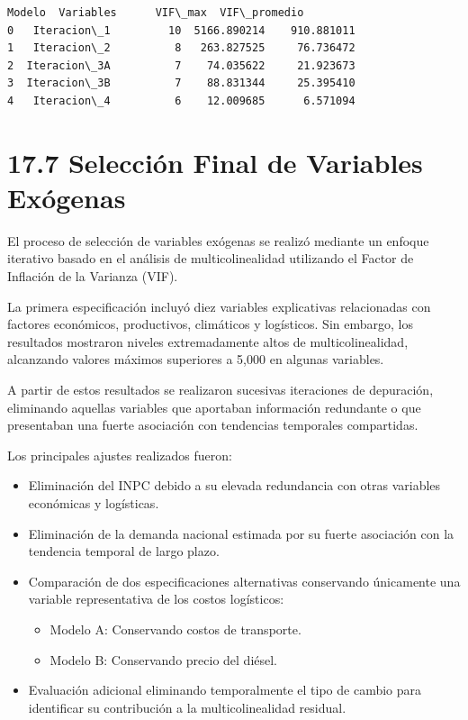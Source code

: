 \documentclass[11pt]{article}
\makeatletter
\providecommand{\tightlist}{%
      \setlength{\itemsep}{0pt}\setlength{\parskip}{0pt}}
\newcommand{\boxspacing}{\kern\kvtcb@left@rule\kern\kvtcb@boxsep}
\newcommand{\prompt}[4]{
        {\ttfamily\llap{{\color{#2}[#3]:\hspace{3pt}#4}}\vspace{-\baselineskip}}
    }
\makeatother
\begin{document}
            \begin{tcolorbox}[breakable, size=fbox, boxrule=.5pt, pad at break*=1mm, opacityfill=0]
\prompt{Out}{outcolor}{52}{\boxspacing}
\begin{Verbatim}[commandchars=\\\{\}]
         Modelo  Variables      VIF\_max  VIF\_promedio
0   Iteracion\_1         10  5166.890214    910.881011
1   Iteracion\_2          8   263.827525     76.736472
2  Iteracion\_3A          7    74.035622     21.923673
3  Iteracion\_3B          7    88.831344     25.395410
4   Iteracion\_4          6    12.009685      6.571094
\end{Verbatim}
\end{tcolorbox}
        
    \hypertarget{selecciuxf3n-final-de-variables-exuxf3genas}{%
\section{17.7 Selección Final de Variables
Exógenas}\label{selecciuxf3n-final-de-variables-exuxf3genas}}

El proceso de selección de variables exógenas se realizó mediante un
enfoque iterativo basado en el análisis de multicolinealidad utilizando
el Factor de Inflación de la Varianza (VIF).

La primera especificación incluyó diez variables explicativas
relacionadas con factores económicos, productivos, climáticos y
logísticos. Sin embargo, los resultados mostraron niveles extremadamente
altos de multicolinealidad, alcanzando valores máximos superiores a
5,000 en algunas variables.

A partir de estos resultados se realizaron sucesivas iteraciones de
depuración, eliminando aquellas variables que aportaban información
redundante o que presentaban una fuerte asociación con tendencias
temporales compartidas.

Los principales ajustes realizados fueron:

\begin{itemize}
\tightlist
\item
  Eliminación del INPC debido a su elevada redundancia con otras
  variables económicas y logísticas.
\item
  Eliminación de la demanda nacional estimada por su fuerte asociación
  con la tendencia temporal de largo plazo.
\item
  Comparación de dos especificaciones alternativas conservando
  únicamente una variable representativa de los costos logísticos:

  \begin{itemize}
  \tightlist
  \item
    Modelo A: Conservando costos de transporte.
  \item
    Modelo B: Conservando precio del diésel.
  \end{itemize}
\item
  Evaluación adicional eliminando temporalmente el tipo de cambio para
  identificar su contribución a la multicolinealidad residual.
\end{itemize}
\end{document}
